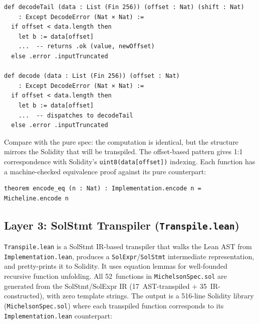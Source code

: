 \documentclass[11pt,a4paper]{article}
\begin{document}
\begin{codebox}
\begin{lstlisting}[language=Lean4]
def decodeTail (data : List (Fin 256)) (offset : Nat) (shift : Nat)
    : Except DecodeError (Nat × Nat) :=
  if offset < data.length then
    let b := data[offset]
    ...  -- returns .ok (value, newOffset)
  else .error .inputTruncated

def decode (data : List (Fin 256)) (offset : Nat)
    : Except DecodeError (Nat × Nat) :=
  if offset < data.length then
    let b := data[offset]
    ...  -- dispatches to decodeTail
  else .error .inputTruncated
\end{lstlisting}
\end{codebox}

Compare with the pure spec: the computation is identical, but the structure
mirrors the Solidity that will be transpiled.  The offset-based pattern gives
1:1 correspondence with Solidity's \texttt{uint8(data[offset])} indexing.
Each function has a machine-checked equivalence proof against its pure
counterpart:

\begin{codebox}
\begin{lstlisting}[language=Lean4]
theorem encode_eq (n : Nat) : Implementation.encode n = Micheline.encode n
\end{lstlisting}
\end{codebox}

\subsection{Layer 3: SolStmt Transpiler (\texttt{Transpile.lean})}

\texttt{Transpile.lean} is a SolStmt IR-based transpiler that walks the Lean
AST from \texttt{Implemen\-tation.lean}, produces a
\texttt{SolExpr}/\texttt{SolStmt} intermediate representation, and
pretty-prints it to Solidity.  It uses equation lemmas for well-founded
recursive function unfolding.  All 52~functions in
\texttt{MichelsonSpec.sol} are generated from the SolStmt/SolExpr IR
(17~AST-transpiled + 35~IR-constructed), with zero template strings.
The output is a 516-line Solidity library (\texttt{MichelsonSpec.sol})
where each transpiled function corresponds to its
\texttt{Implemen\-tation.lean} counterpart:
\end{document}
